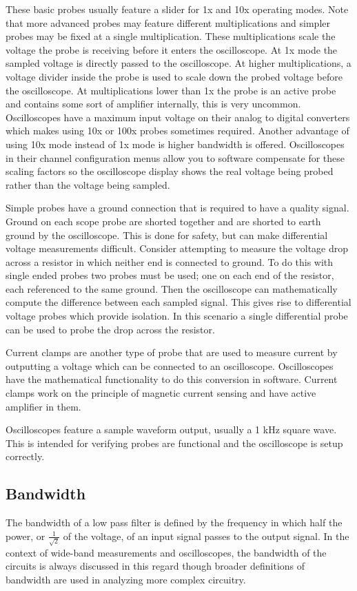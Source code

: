 \documentclass[main.tex]{subfiles}
\begin{document}
These basic probes usually feature a slider for 1x and 10x operating modes. Note that more advanced probes may feature different multiplications and simpler probes may be fixed at a single multiplication. These multiplications scale the voltage the probe is receiving before it enters the oscilloscope. At 1x mode the sampled voltage is directly passed to the oscilloscope. At higher multiplications, a voltage divider inside the probe is used to scale down the probed voltage before the oscilloscope. At multiplications lower than 1x the probe is an active probe and contains some sort of amplifier internally, this is very uncommon. Oscilloscopes have a maximum input voltage on their analog to digital converters which makes using 10x or 100x probes sometimes required. Another advantage of using 10x mode instead of 1x mode is higher bandwidth is offered. Oscilloscopes in their channel configuration menus allow you to software compensate for these scaling factors so the oscilloscope display shows the real voltage being probed rather than the voltage being sampled.

Simple probes have a ground connection that is required to have a quality signal. Ground on each scope probe are shorted together and  are shorted to earth ground by the oscilloscope. This is done for safety, but can make differential voltage measurements difficult. Consider attempting to measure the voltage drop across a resistor in which neither end is connected to ground. To do this with single ended probes two probes must be used; one on each end of the resistor, each referenced to the same ground. Then the oscilloscope can mathematically compute the difference between each sampled signal. This gives rise to differential voltage probes which provide isolation. In this scenario a single differential probe can be used to probe the drop across the resistor.

Current clamps are another type of probe that are used to measure current by outputting a voltage which can be connected to an oscilloscope. Oscilloscopes have the mathematical functionality to do this conversion in software. Current clamps work on the principle of magnetic current sensing and have active amplifier in them.

Oscilloscopes feature a sample waveform output, usually a 1 kHz square wave. This is intended for verifying probes are functional and the oscilloscope is setup correctly.

\subsection{Bandwidth}
The bandwidth of a low pass filter is defined by the frequency in which half the power, or $\frac{1}{\sqrt{2}}$ of the voltage, of an input signal passes to the output signal. In the context of wide-band measurements and oscilloscopes, the bandwidth of the circuits is always discussed in this regard though broader definitions of bandwidth are used in analyzing more complex circuitry.
\end{document}
